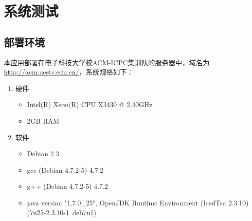 
\chapter{系统测试}
\section{部署环境}
本应用部署在电子科技大学校ACM-ICPC集训队的服务器中，域名为\url{http://acm.uestc.edu.cn/}，系统规格如下：
\begin{enumerate}
	\item 硬件
	\begin{itemize}
		\item Intel(R) Xeon(R) CPU X3430 @ 2.40GHz
		\item 2GB RAM
	\end{itemize}
	\item 软件
	\begin{itemize}
		\item Debian 7.3
		\item gcc (Debian 4.7.2-5) 4.7.2
		\item g++ (Debian 4.7.2-5) 4.7.2
		\item java version "1.7.0\_25", OpenJDK Runtime Environment (IcedTea 2.3.10) (7u25-2.3.10-1~deb7u1)
	\end{itemize}
\end{enumerate}